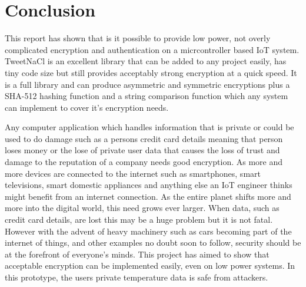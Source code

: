 


\chapter{Conclusion}
\label{conc}

This report has shown that is it possible to provide low power, not overly complicated encryption and authentication on a micrcontroller based IoT system. TweetNaCl is an excellent library that can be added to any project easily, has tiny code size but still provides acceptably strong encryption at a quick speed. It is a full library and can produce asymmetric and symmetric encryptions plus a SHA-512 hashing function and a string comparison function which any system can implement to cover it's encryption needs.

Any computer application which handles information that is private or could be used to do damage such as a persons credit card details meaning that person loses money or the lose of private user data that causes the loss of trust and damage to the reputation of a company needs good encryption. As more and more devices are connected to the internet such as smartphones, smart televisions, smart domestic appliances and anything else an IoT engineer thinks might benefit from an internet connection. As the entire planet shifts more and more into the digital world, this need grows ever larger. When data, such as credit card details, are lost this may be a huge problem but it is not fatal. However with the advent of heavy machinery such as cars becoming part of the internet of things, and other examples no doubt soon to follow, security should be at the forefront of everyone's minds. This project has aimed to show that acceptable encryption can be implemented easily, even on low power systems. In this prototype, the users private temperature data is safe from attackers. 

